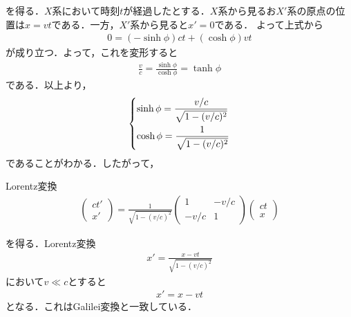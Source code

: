 \documentclass{report}
\begin{document}
  を得る．$X$系において時刻$t$が経過したとする．$X$系から見るお$X'$系の原点の位置は$x=vt$である．一方，$X'$系から見ると$x'=0$である．
  よって上式から
  \begin{align}
    0 = (-\sinh\phi)ct + (\cosh\phi)vt
  \end{align}
  が成り立つ．よって，これを変形すると
  \begin{align}
    \frac{v}{c} = \frac{\sinh\phi}{\cosh\phi} = \tanh\phi
  \end{align}
  である．以上より，
  \begin{align}
    \begin{dcases}
      \sinh\phi = \frac{v/c}{\sqrt{1- (v/c)^2}}\\
      \cosh\phi = \frac{1}{\sqrt{1- (v/c)^2}}
    \end{dcases}
  \end{align}
  であることがわかる．したがって，
  \begin{itembox}[l]{Lorentz変換}
    \begin{align}
      \label{LorentzTransformation}
      \begin{pmatrix}
        ct' \\ x'
      \end{pmatrix}
      =
      \frac{1}{\sqrt{1 - (v/c)^2}}
      \begin{pmatrix}
        1 & -v/c\\
        -v/c & 1
      \end{pmatrix}
      \begin{pmatrix}
        ct\\x
      \end{pmatrix}
    \end{align}
  \end{itembox}
  を得る．Lorentz変換
  \begin{align}
    x' = \frac{x-vt}{\sqrt{1-(v/c)^2}}
  \end{align}
  において$v \ll c$とすると
  \begin{align}
    x' = x - vt
  \end{align}
  となる．これはGalilei変換と一致している．
\end{document}
